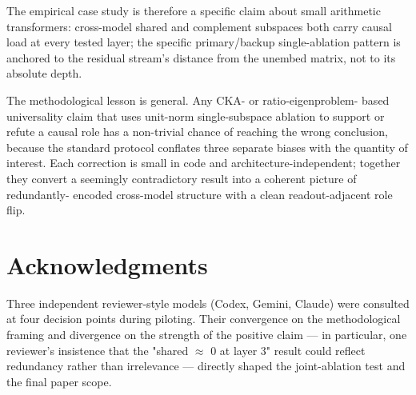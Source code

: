 The empirical case study is therefore a specific claim about small
arithmetic transformers: cross-model shared and complement subspaces
both carry causal load at every tested layer; the specific
primary/backup single-ablation pattern is anchored to the residual
stream's distance from the unembed matrix, not to its absolute depth.

The methodological lesson is general. Any CKA- or ratio-eigenproblem-
based universality claim that uses unit-norm single-subspace ablation
to support or refute a causal role has a non-trivial chance of reaching
the wrong conclusion, because the standard protocol conflates three
separate biases with the quantity of interest. Each correction is small
in code and architecture-independent; together they convert a
seemingly contradictory result into a coherent picture of redundantly-
encoded cross-model structure with a clean readout-adjacent role flip.

\section{Acknowledgments}

Three independent reviewer-style models (Codex, Gemini, Claude) were
consulted at four decision points during piloting. Their convergence on
the methodological framing and divergence on the strength of the
positive claim --- in particular, one reviewer's insistence that the
"shared $\approx$ 0 at layer 3" result could reflect redundancy rather than
irrelevance --- directly shaped the joint-ablation test and the final
paper scope.
